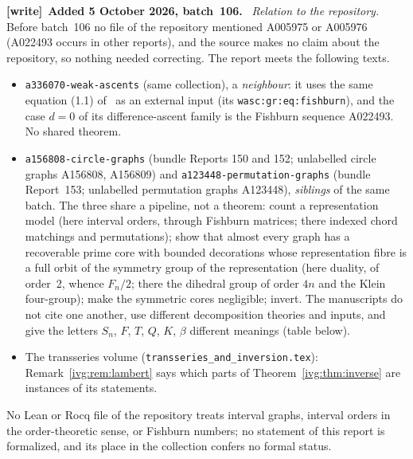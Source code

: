 \documentclass[11pt,letterpaper]{article}
\theoremstyle{definition}\newtheorem{definition}[theorem]{Definition}
\theoremstyle{remark}\newtheorem{remark}[theorem]{Remark}
\newcommand{\file}[1]{\nolinkurl{#1}}
\newenvironment{writenote}[1][]{\par\smallskip\begingroup\small
 \noindent\textbf{[write]}\if\relax\detokenize{#1}\relax\else~\textbf{#1.}\fi\ }%
 {\par\endgroup\smallskip}
\begin{document}
\begin{writenote}[Added 5 October 2026, batch~106]
\emph{Relation to the repository.} Before batch~106 no file of the
repository mentioned A005975 or A005976 (A022493 occurs in other reports),
and the source makes no claim about the repository, so nothing needed
correcting. The report meets the following texts.
\begin{itemize}\raggedright
\item \file{a336070-weak-ascents} (same collection), a \emph{neighbour}: it
 uses the same equation (1.1) of~\cite{HJ} as an external input (its
 \file{wasc:gr:eq:fishburn}), and the case $d=0$ of its difference-ascent
 family is the Fishburn sequence A022493. No shared theorem.
\item \file{a156808-circle-graphs} (bundle Reports 150 and 152; unlabelled
 circle graphs A156808, A156809) and \file{a123448-permutation-graphs}
 (bundle Report~153; unlabelled permutation graphs A123448), \emph{siblings}
 of the same batch. The three share a pipeline, not a theorem: count a
 representation model (here interval orders, through Fishburn matrices;
 there indexed chord matchings and permutations); show that almost every
 graph has a recoverable prime core with bounded decorations whose
 representation fibre is a full orbit of the symmetry group of the
 representation (here duality, of order~2, whence $F_n/2$; there the
 dihedral group of order $4n$ and the Klein four-group); make the symmetric
 cores negligible; invert. The manuscripts do not cite one another, use
 different decomposition theories and inputs, and give the letters $S_n$,
 $F$, $T$, $Q$, $K$, $\beta$ different meanings (table below).
\item The transseries volume
 (\file{transseries_and_inversion.tex}): Remark~\ref{ivg:rem:lambert} says
 which parts of Theorem~\ref{ivg:thm:inverse} are instances of its
 statements.
\end{itemize}
No Lean or Rocq file of the repository treats interval graphs, interval
orders in the order-theoretic sense, or Fishburn numbers; no statement of
this report is formalized, and its place in the collection confers no formal
status.
\end{writenote}
\end{document}
